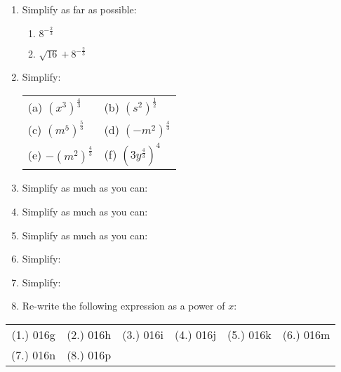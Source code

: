 \begin{eocexercises}{}
\begin{enumerate}
\item{Simplify as far as possible:
\begin{enumerate}
\item{$8^{-\frac{2}{3}}$}
\item{$\sqrt{16}+8^{-\frac{2}{3}}$}
\end{enumerate}}
\item{Simplify:
\begin{center}
\begin{tabular}{p{4cm}p{4cm}}
(a) $(x^3)^\frac{4}{3}$ & (b) $(s^2)^\frac{1}{2}$\\
(c) $(m^5)^\frac{5}{3}$& (d) $(-m^2)^\frac{4}{3}$\\
(e) $-(m^2)^\frac{4}{3}$&(f) $(3y^\frac{4}{3})^4$\\
\end{tabular}
\end{center}}

\item{Simplify as much as you can:
}

\item{Simplify as much as you can:
}

\item{Simplify as much as you can:
}
 \item{Simplify:
}

\item{Simplify:
}

\item{Re-write the following expression as a power of $x$:
}

\end{enumerate}



\par \practiceinfo
\par \begin{tabular}[h]{cccccc}
(1.)	016g	&
(2.)	016h	&
(3.)	016i	&
(4.)	016j	&
(5.)	016k	&
(6.)	016m	\\ %
(7.)	016n	&
(8.)	016p	&
\end{tabular}
\end{eocexercises} 




